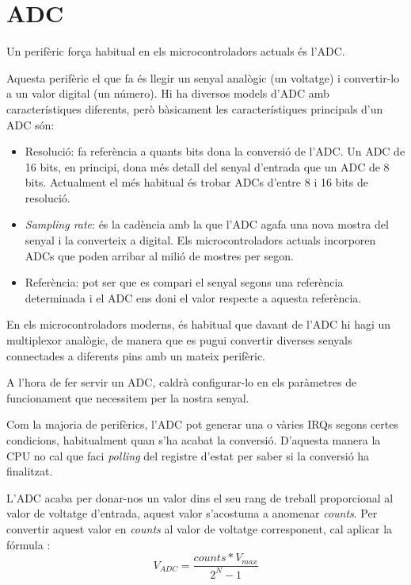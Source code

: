 \chapter{ADC}
\label{sub:ADC}
Un perifèric força habitual en els microcontroladors actuals és l'\gls{ADC}.

Aquesta perifèric el que fa és llegir un senyal analògic (un voltatge) i convertir-lo a un valor digital (un número). Hi ha diversos models d'\gls{ADC} amb característiques diferents, però bàsicament les característiques principals d'un ADC són:
\begin{itemize}
 \item Resolució: fa referència a quants bits dona la conversió de l'ADC. Un ADC de 16 bits, en principi, dona més detall del senyal d'entrada que un ADC de 8 bits. Actualment el més habitual és trobar ADCs d'entre 8 i 16 bits de resolució.
 \item {\em Sampling rate}: és la cadència amb la que l'ADC agafa una nova mostra del senyal i la converteix a digital. Els microcontroladors actuals incorporen ADCs que poden arribar al milió de mostres per segon.
 \item Referència: pot ser que es compari el senyal segons una referència determinada i el ADC ens doni el valor respecte a aquesta referència.
\end{itemize}

En els microcontroladors moderns, és habitual que davant de l'ADC hi hagi un multiplexor analògic, de manera que es pugui convertir diverses senyals connectades a diferents pins amb un mateix perifèric.

A l'hora de fer servir un \gls{ADC}, caldrà configurar-lo en els paràmetres de funcionament que necessitem per la nostra senyal.

Com la majoria de perifèrics, l'ADC pot generar una o vàries \glspl{IRQ} segons certes condicions, habitualment quan s'ha acabat la conversió. D'aquesta manera la CPU no cal que faci {\em polling} del registre d'estat per saber si la conversió ha finalitzat.

L'ADC acaba per donar-nos un valor dins el seu rang de treball proporcional al valor de voltatge d'entrada, aquest valor s'acostuma a anomenar {\em counts}. Per convertir aquest valor en {\em counts} al valor de voltatge corresponent, cal aplicar la fórmula :
\begin{equation}
\label{eq:ADCFormula}
 V_{ADC} = \frac{{counts} * V_{max} }{2^N-1}
\end{equation}


